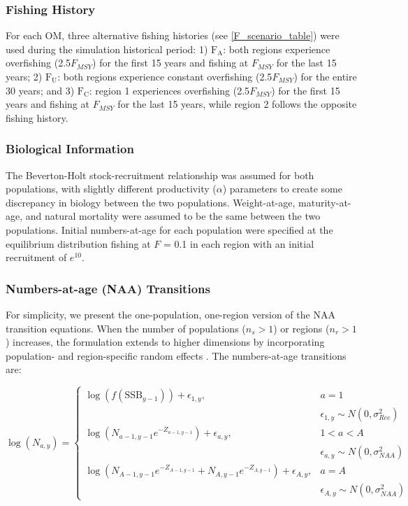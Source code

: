 \documentclass[
  12pt,
]{article}
\begin{document}
\hypertarget{fishing-history}{%
\subsubsection{Fishing History}\label{fishing-history}}

For each OM, three alternative fishing histories (see
\autoref{F_scenario_table}) were used during the simulation historical
period: 1) \(\text{F}_\text{A}\): both regions experience overfishing
(2.5\(F_{MSY}\)) for the first 15 years and fishing at \(F_{MSY}\) for
the last 15 years; 2) \(\text{F}_\text{U}\): both regions experience
constant overfishing (2.5\(F_{MSY}\)) for the entire 30 years; and 3)
\(\text{F}_\text{C}\): region 1 experiences overfishing (2.5\(F_{MSY}\))
for the first 15 years and fishing at \(F_{MSY}\) for the last 15 years,
while region 2 follows the opposite fishing history.

\hypertarget{biological-information}{%
\subsubsection{Biological Information}\label{biological-information}}

The Beverton-Holt stock-recruitment relationship was assumed for both
populations, with slightly different productivity (\({\alpha}\))
parameters to create some discrepancy in biology between the two
populations. Weight-at-age, maturity-at-age, and natural mortality were
assumed to be the same between the two populations. Initial
numbers-at-age for each population were specified at the equilibrium
distribution fishing at \({F}\) = 0.1 in each region with an initial
recruitment of \(e^{10}\).

\hypertarget{numbers-at-age-naa-transitions}{%
\subsubsection{Numbers-at-age (NAA)
Transitions}\label{numbers-at-age-naa-transitions}}

For simplicity, we present the one-population, one-region version of the
NAA transition equations. When the number of populations (\(n_s > 1\))
or regions (\(n_r > 1\)) increases, the formulation extends to higher
dimensions by incorporating population- and region-specific random
effects \citep{Miller2025}. The numbers-at-age transitions are:

\begin{equation}
\log(N_{a,y}) =
\begin{cases}
\log(f(\text{SSB}_{y-1})) + \epsilon_{1,y}, & a = 1 \\[-0.3em]
& \epsilon_{1,y} \sim N(0,\sigma_{Rec}^2) \\
\log(N_{a-1,y-1} e^{-Z_{a-1,y-1}}) + \epsilon_{a,y}, & 1 < a < A \\[-0.3em]
& \epsilon_{a,y} \sim N(0,\sigma_{NAA}^2) \\
\log(N_{A-1,y-1} e^{-Z_{A-1,y-1}} + N_{A,y-1} e^{-Z_{A,y-1}}) + \epsilon_{A,y}, & a = A \\[-0.3em]
& \epsilon_{A,y} \sim N(0,\sigma_{NAA}^2)
\end{cases}
\end{equation}
\end{document}
